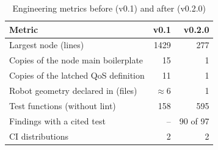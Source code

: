 \begin{table}[t]
  \centering
  \caption{Engineering metrics before (v0.1) and after (v0.2.0)}
  \label{tab:metrics}
  \begin{tabular}{@{}lrr@{}}
    \toprule
    Metric & v0.1 & v0.2.0 \\
    \midrule
    Largest node (lines) & 1429 & 277 \\
    Copies of the node main boilerplate & 15 & 1 \\
    Copies of the latched QoS definition & 11 & 1 \\
    Robot geometry declared in (files) & $\approx 6$ & 1 \\
    Test functions (without lint) & 158 & 595 \\
    Findings with a cited test & -- & 90 of 97 \\
    CI distributions & 2 & 2 \\
    \bottomrule
  \end{tabular}
\end{table}
